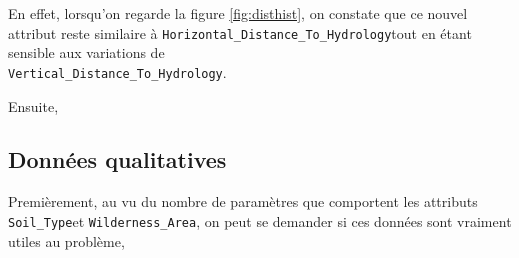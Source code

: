 \documentclass[12pt,a4paper]{article}
\numberwithin{equation}{section}
\newcommand{\hhydro}{\texttt{Horizontal\_Distance\_To\_Hydrology}}
\newcommand{\vhydro}{\texttt{Vertical\_Distance\_To\_Hydrology}}
\newcommand{\wilderness}{\texttt{Wilderness\_Area}}
\newcommand{\soil}{\texttt{Soil\_Type}}
\begin{document}
	En effet, lorsqu'on regarde la figure \ref{fig:disthist}, on constate que ce nouvel attribut reste similaire à \hhydro tout en étant sensible aux variations de\\ \vhydro.\\
	
	\nopagebreak
	
	Ensuite, 
	

	
	\subsection{Données qualitatives}
	Premièrement, au vu du nombre de paramètres que comportent les attributs \soil et \wilderness, on peut se demander si ces données sont vraiment utiles au problème,
	
	\begin{figure}[h]
		\centering
	\hfill
	\hfill

	\medskip
	

\end{figure}
\end{document}
